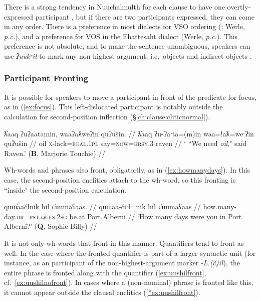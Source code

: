 
There is a strong tendency in Nuuchahnulth for each clause to have one overtly-expressed participant \citep[p.~38]{rose1981}, but if there are two participants expressed, they can come in any order. There is a preference in most dialects for VSO ordering (\citealt[p.~267]{jacobsen1993}; Werle, \textit{p.c.}), and a preference for VOS in the Ehattesaht dialect (Werle, \textit{p.c.}). This preference is not absolute, and to make the sentence unambiguous, speakers can use \textit{ʔuukʷił} to mark any non-highest argument, i.e.\ objects and indirect objects \citep{woo2007b, woo2007a}.

\subsubsection{Participant Fronting} \label{ch:clause:fronting}

It is possible for speakers to move a participant in front of the predicate for focus, as in (\ref{ex:focus}). This left-dislocated participant is notably outside the calculation for second-position inflection (\S\ref{ch:clause:cliticnormal}).

\ex \label{ex:focus}
\begingl
\glpreamble ƛ̓aaq ʔuʔaatamin, waaʔaƛweʔin quʔušin. //
\gla ƛ̓aaq ʔu-ʔaˑta=(m)in waa=!aƛ=weˑʔin quʔušin //
\glb oil \textsc{x}-lack=\textsc{real.1pl} say=\textsc{now}=\textsc{hrsy.3} raven //
\glft ` ``We need \textit{oil}," said Raven.' (\textbf{B}, Marjorie Touchie) //
\endgl
\xe

Wh-words and phrases also front, obligatorily, as in (\ref{ex:howmanydays}). In this case, the second-position enclitics attach to the wh-word, so this fronting is ``inside" the second-position calculation.

\ex \label{ex:howmanydays}
\begingl
\glpreamble qum̓aačłnik hił c̓uumaʕaas. //
\gla qum̓aa-čiˑł=nik hił c̓uumaʕaas //
\glb how.many-day.\textsc{dr}=\textsc{pst.ques.2sg} be.at Port.Alberni //
\glft `How many days were you in Port Alberni?' (\textbf{Q}, Sophie Billy) //
\endgl
\xe

It is not only wh-words that front in this manner. Quantifiers tend to front as well. In the case where the fronted quantifier is part of a larger syntactic unit (for instance, as an participant of the non-highest-argument marker \textit{-L.(č)ił}), the entire phrase is fronted along with the quantifier (\ref{ex:uushilfront}, cf.\ \ref{ex:uushilnofront}). In cases where a (non-nominal) phrase is fronted like this, it cannot appear outside the clausal enclitics (\ref{*ex:uushilfront}).

